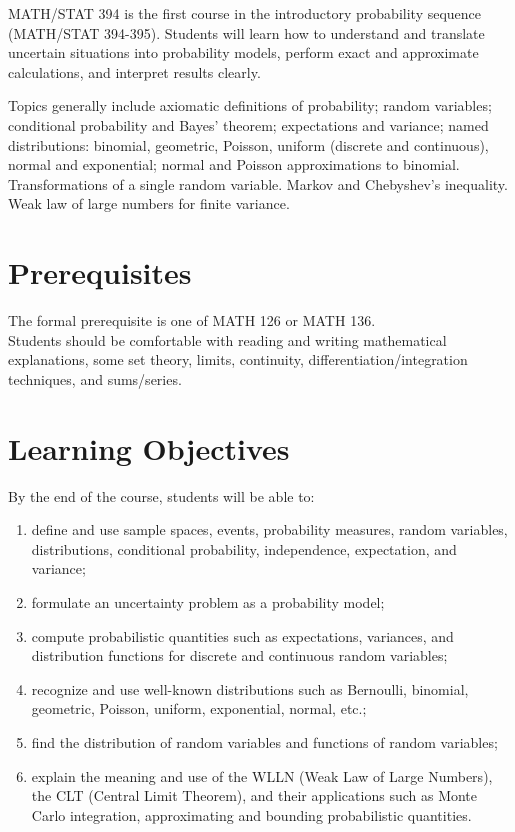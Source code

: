 \documentclass[11pt]{article}
\begin{document}
MATH/STAT 394 is the first course in the introductory probability sequence (MATH/STAT 394-395). Students will learn how to understand and translate uncertain situations into probability models, perform exact and approximate calculations, and interpret results clearly.

Topics generally include axiomatic definitions of probability; random variables; conditional probability and Bayes' theorem; expectations and variance; named distributions: binomial, geometric, Poisson, uniform (discrete and continuous), normal and exponential; normal and Poisson approximations to binomial. Transformations of a single random variable. Markov and Chebyshev's inequality. Weak law of large numbers for finite variance.

\section{Prerequisites}

The formal prerequisite is one of MATH 126 or MATH 136. \\ Students should be comfortable with reading and writing mathematical explanations, some set theory, limits, continuity, differentiation/integration techniques, and sums/series.

\section{Learning Objectives}

By the end of the course, students will be able to:
\begin{enumerate}[leftmargin=*]
    \item define and use sample spaces, events, probability measures, random variables, distributions, conditional probability, independence, expectation, and variance;
    \item formulate an uncertainty problem as a probability model;
    \item compute probabilistic quantities such as expectations, variances, and distribution functions for discrete and continuous random variables;
    \item recognize and use well-known distributions such as Bernoulli, binomial, geometric, Poisson, uniform, exponential, normal, etc.;
    \item find the distribution of random variables and functions of random variables;
    \item explain the meaning and use of the WLLN (Weak Law of Large Numbers), the CLT (Central Limit Theorem), and their applications such as Monte Carlo integration, approximating and bounding probabilistic quantities.
\end{enumerate}
\end{document}
